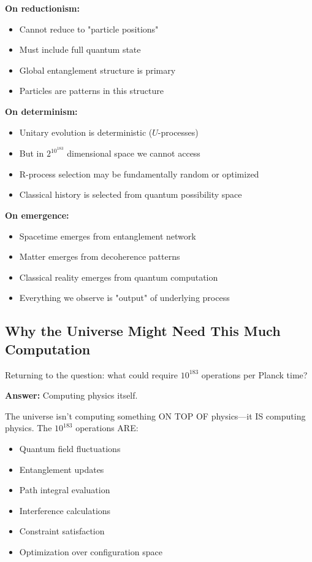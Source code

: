 \textbf{On reductionism:}
\begin{itemize}
\item Cannot reduce to "particle positions"
\item Must include full quantum state
\item Global entanglement structure is primary
\item Particles are patterns in this structure
\end{itemize}

\textbf{On determinism:}
\begin{itemize}
\item Unitary evolution is deterministic ($U$-processes)
\item But in $2^{10^{183}}$ dimensional space we cannot access
\item R-process selection may be fundamentally random or optimized
\item Classical history is selected from quantum possibility space
\end{itemize}

\textbf{On emergence:}
\begin{itemize}
\item Spacetime emerges from entanglement network
\item Matter emerges from decoherence patterns
\item Classical reality emerges from quantum computation
\item Everything we observe is "output" of underlying process
\end{itemize}

\subsection{Why the Universe Might Need This Much Computation}

Returning to the question: what could require $10^{183}$ operations per Planck time?

\textbf{Answer:} Computing physics itself.

The universe isn't computing something ON TOP OF physics—it IS computing physics. The $10^{183}$ operations ARE:
\begin{itemize}
\item Quantum field fluctuations
\item Entanglement updates
\item Path integral evaluation  
\item Interference calculations
\item Constraint satisfaction
\item Optimization over configuration space
\end{itemize}

